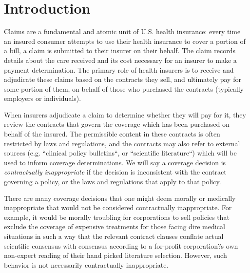 \documentclass[12pt, a4paper,twoside,parskip=full]{report}
\theoremstyle{plain} %
\theoremstyle{definition} %
\theoremstyle{remark} %
\numberwithin{equation}{chapter}
\begin{document}
		
		\tableofcontents
		
		
		
		\chapter{Introduction}\label{intro}
		
		Claims are a fundamental and atomic unit of U.S. health insurance: every time an insured consumer attempts to use their health insurance to cover a portion of a bill, a claim is submitted to their insurer on their behalf. The claim records details about the care received and its cost necessary for an insurer to make a payment determination. The primary role of health insurers is to receive and adjudicate these claims based on the contracts they sell, and ultimately pay for some portion of them, on behalf of those who purchased the contracts (typically employers or individuals).
		
		When insurers adjudicate a claim to determine whether they will pay for it,
		they review the contracts that govern the coverage which has been purchased on
		behalf of the insured. The permissible content in these contracts is often
		restricted by laws and regulations, and the contracts may also
		refer to external sources (e.g. ``clinical policy bulletins``,
		or ``scientific literature``) which will be used to inform coverage determinations. 
		We will say a coverage decision is \emph{contractually inappropriate}
		if the decision is inconsistent with the contract governing
		a policy, or the laws and regulations that apply to that policy.
		
		There are many coverage decisions that one might deem morally
		or medically inappropriate that would not be considered contractually
		inappropriate. For example, it would be morally troubling for corporations 
		to sell policies that exclude the coverage of 
		expensive treatments for those facing dire medical situations in such a way 
		that the relevant contract clauses conflate actual scientific consensus 
		with consensus according to a for-profit corporation?s own non-expert reading of 
		their hand picked literature selection. However, 
		such behavior is not necessarily contractually inappropriate.
\end{document}
